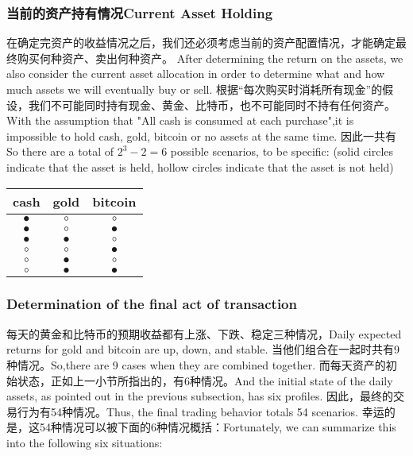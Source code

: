\documentclass{mcmthesis}
\begin{document}
\subsubsection{当前的资产持有情况Current Asset Holding}
在确定完资产的收益情况之后，我们还必须考虑当前的资产配置情况，才能确定最终购买何种资产、卖出何种资产。
After determining the return on the assets, we also consider the current asset allocation in order to determine what and how much assets we will eventually buy or sell.
根据“每次购买时消耗所有现金”的假设，我们不可能同时持有现金、黄金、比特币，也不可能同时不持有任何资产。
With the assumption that "All cash is consumed at each purchase",it is impossible to hold cash, gold, bitcoin or no assets at the same time.
因此一共有%
So there are a total of $2^3-2=6$ possible scenarios, to be specific: (solid circles indicate that the asset is held, hollow circles indicate that the asset is not held)

\begin{tabular}{c c c}
  \hline
  cash&gold&bitcoin\\
  \hline
  \hline
  $\bullet$ & $\circ$  &  $\circ$\\
  \hline
  $\bullet$ & $\circ$  &  $\bullet $\\
  \hline
  $\bullet$ & $\bullet $  &  $\circ  $\\
  \hline
  $\circ $ & $\circ$  &  $\bullet $\\
  \hline
  $\circ $ & $\bullet $  &  $\circ  $\\
  \hline
  $\circ $ & $\bullet $  &  $\bullet   $\\
  \hline
  \end{tabular}


\subsubsection{Determination of the final act of transaction}
每天的黄金和比特币的预期收益都有上涨、下跌、稳定三种情况，Daily expected returns for gold and bitcoin are up, down, and stable.
当他们组合在一起时共有9种情况。So,there are 9 cases when they are combined together.
而每天资产的初始状态，正如上一小节所指出的，有6种情况。And the initial state of the daily assets, as pointed out in the previous subsection, has six profiles.
因此，最终的交易行为有54种情况。Thus, the final trading behavior totals 54 scenarios.
幸运的是，这54种情况可以被下面的6种情况概括：Fortunately, we can summarize this into the following six situations:
\end{document}
